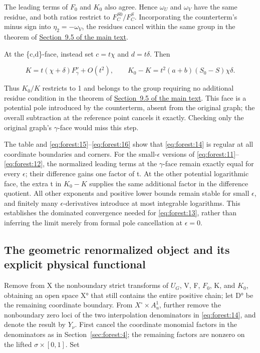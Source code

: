\documentclass[11pt,a4paper,oneside]{article}
\theoremstyle{plain}
\theoremstyle{definition}
\theoremstyle{remark}
\numberwithin{equation}{section}
\newcommand{\otherref}[2]{\href{#1.pdf}{#2}}
\begin{document}
The leading terms of \(F_0\) and \(K_0\) also agree. Hence \(\omega _U\) and \(\omega _V\) have the same residue, and both ratios restrict to \(F_C^{S0}/F_C^S\). Incorporating the counterterm's minus sign into \(\eta _2=- \omega _V\), the residues cancel within the same group in the theorem of \otherref{feynman_periods_long_paper_en}{Section~9.5 of the main text}.

At the \{c,d\}-face, instead set \(c=t\chi \) and \(d=t\delta \). Then

\begin{equation}
K=t(\chi+\delta)F_\gamma^\nu+O(t^2),\qquad
 K_0-K=t^2(a+b)(S_0-S)\chi\delta.                              \label{eq:forest:16}
\end{equation}

Thus \(K_0/K\) restricts to 1 and belongs to the group requiring no additional residue condition in the theorem of \otherref{feynman_periods_long_paper_en}{Section~9.5 of the main text}. This face is a potential pole introduced by the counterterm, absent from the original graph; the overall subtraction at the reference point cancels it exactly. Checking only the original graph's \(\gamma \)-face would miss this step.

The table and \eqref{eq:forest:15}--\eqref{eq:forest:16} show that \eqref{eq:forest:14} is regular at all coordinate boundaries and corners. For the small-\(\epsilon \) versions of \eqref{eq:forest:11}--\eqref{eq:forest:12}, the normalized leading terms at the \(\gamma \)-face remain exactly equal for every \(\epsilon \); their difference gains one factor of t. At the other potential logarithmic face, the extra t in \(K_0- K\) supplies the same additional factor in the difference quotient. All other exponents and positive lower bounds remain stable for small \(\epsilon \), and finitely many \(\epsilon \)-derivatives introduce at most integrable logarithms. This establishes the dominated convergence needed for \eqref{eq:forest:13}, rather than inferring the limit merely from formal pole cancellation at \(\epsilon =0\).


\subsection{The geometric renormalized object and its explicit physical functional}\label{sec:forest:5}

Remove from X the nonboundary strict transforms of \(U_G\), V, F, \(F_0\), K, and \(K_0\), obtaining an open space X° that still contains the entire positive chain; let D° be the remaining coordinate boundary. From \(X^\circ\times A^{1}_u\), further remove the nonboundary zero loci of the two interpolation denominators in \eqref{eq:forest:14}, and denote the result by \(Y_\nu \). First cancel the coordinate monomial factors in the denominators as in Section~\ref{sec:forest:4}; the remaining factors are nonzero on the lifted \(\sigma \times [0,1]\). Set
\end{document}
